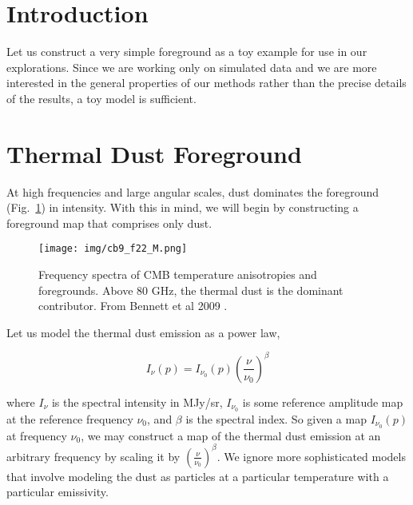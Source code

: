\documentclass[twoside,10pt]{article}
\title{\doctitle}
\author{\myname}
\date{Jan 20, 2015}
\begin{document}
\maketitle

\section{Introduction}
\label{sec:intro}

Let us construct a very simple foreground as a toy example for use in our
explorations. Since we are working only on simulated data and we are more
interested in the general properties of our methods rather than the precise
details of the results, a toy model is sufficient.

\section{Thermal Dust Foreground} %
\label{sec:thermal_dust_foreground}

At high frequencies and large angular scales, dust dominates the foreground
(Fig.~\ref{fig:foregrounds_vs_frequency}) in intensity. With this in mind, we
will begin by constructing a foreground map that comprises only dust.

\begin{figure}[ht]
    \begin{center}
        \texttt{[image: img/cb9\_f22\_M.png]}
    \end{center}
    \caption{Frequency spectra of CMB temperature anisotropies and
    foregrounds. Above 80 GHz, the thermal dust is the dominant contributor.
    From Bennett et al 2009 \cite{bennett_nine-year_2013}.}
    \label{fig:foregrounds_vs_frequency}
\end{figure}

Let us model the thermal dust emission as a power law,

\begin{equation}
    \label{eq:dust_power_law}
    I_\nu(p) = I_{\nu_0}(p) \left( \frac{\nu}{\nu_0} \right)^\beta
\end{equation}

where $I_\nu$ is the spectral intensity in MJy/sr, $I_{\nu_0}$ is some
reference amplitude map at the reference frequency $\nu_0$, and $\beta$ is the
spectral index. So given a map $I_{\nu_0}(p)$ at frequency $\nu_0$, we may
construct a map of the thermal dust emission at an arbitrary frequency by
scaling it by $\left( \frac{\nu}{\nu_0} \right)^\beta$. We ignore more
sophisticated models that involve modeling the dust as particles at a
particular temperature with a particular emissivity.
\end{document}
